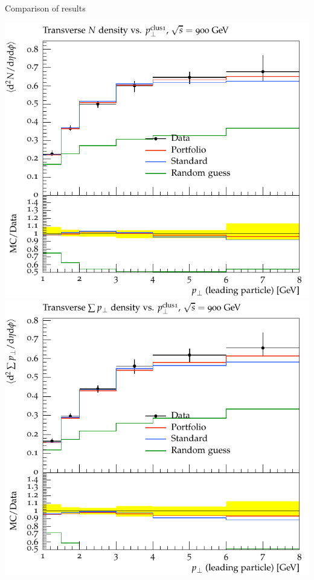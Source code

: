 \begin{frame}{Comparison of results}
    \begin{minipage}{.48\textwidth}%
        \begin{center}
            \includegraphics[width=.92\textwidth]{oo/test_cmp_1_std/ATLAS_2011_S8994773/d01-x01-y01.pdf}\\
            \includegraphics[width=.92\textwidth]{oo/test_cmp_1_std/ATLAS_2011_S8994773/d03-x01-y01.pdf}
        \end{center}
    \end{minipage}%

\end{frame}
